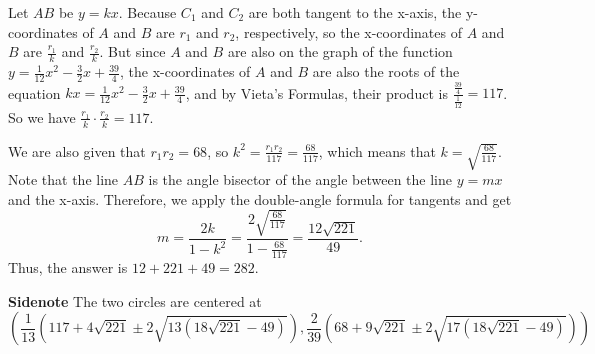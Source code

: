 \begin{enumerate}
 Let $AB$ be $y=kx$. Because $C_1$ and $C_2$ are both tangent to the x-axis, the y-coordinates of $A$ and $B$ are $r_1$ and $r_2$, respectively, so the x-coordinates of $A$ and $B$ are $\frac{r_1}{k}$ and $\frac{r_2}{k}$. But since $A$ and $B$ are also on the graph of the function $y=\frac{1}{12}x^2-\frac{3}{2}x+\frac{39}{4}$, the x-coordinates of $A$ and $B$ are also the roots of the equation $kx=\frac{1}{12}x^2-\frac{3}{2}x+\frac{39}{4}$, and by Vieta's Formulas, their product is $\frac{\frac{39}{4}}{\frac{1}{12}}=117$. So we have $\frac{r_1}{k}\cdot \frac{r_2}{k}=117$.

 We are also given that $r_1r_2=68$, so $k^2=\frac{r_1r_2}{117}=\frac{68}{117}$, which means that $k=\sqrt{\frac{68}{117}}$. Note that the line $AB$ is the angle bisector of the angle between the line $y=mx$ and the x-axis. Therefore, we apply the double-angle formula for tangents and get 
 \[m=\frac{2k}{1-k^2}=\frac{2\sqrt{\frac{68}{117}}}{1-\frac{68}{117}}=\frac{12\sqrt{221}}{49}.\] Thus, the answer is $12+221+49=\boxed{282}$.

 \textbf{Sidenote} The two circles are centered at 
 \[\left (\frac{1}{13}\left (117 + 4 \sqrt{221} \pm 2 \sqrt{13(18 \sqrt{221} - 49)} \right), \frac{2}{39} \left(68 + 9 \sqrt {221} \pm 2 \sqrt{17(18 \sqrt{221} - 49)} \right) \right)\]



\end{enumerate}